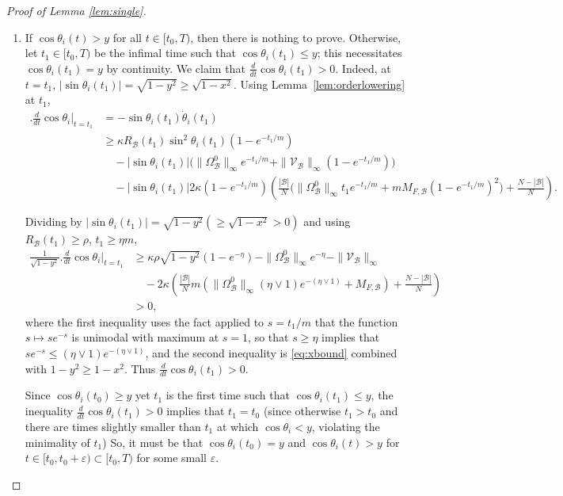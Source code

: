 \documentclass[10pt,a4paper]{amsart}
\begin{document}
\begin{proof}[Proof of Lemma \ref{lem:single}]
	\,
\begin{enumerate}
\item 
If $\cos\theta_i(t)>y$ for all $t\in [t_0,T)$, then there is nothing to prove. Otherwise, let $t_1\in[t_0,T)$ be the infimal time  such that
$\cos\theta_i(t_1)\le y$; this necessitates $\cos\theta_i(t_1)=y$ by continuity. We claim that $\frac{d}{dt}\cos\theta_i(t_1)>0$. Indeed, at $t=t_1$, $|\sin\theta_i(t_1)|=\sqrt{1-y^2}\ge\sqrt{1-x^2}$. Using
Lemma~\ref{lem:orderlowering} at $t_1$,
\begin{align*}
\bigl.\tfrac{d}{dt}\cos\theta_i\bigr|_{t=t_1}
&=-\sin\theta_i(t_1)\dot\theta_i(t_1)\\
&\ge \kappa R_\mathcal{B}(t_1)\sin^2\theta_i(t_1)(1-e^{-t_1/m})\\
&\quad-|\sin\theta_i(t_1)|\bigl(\|\Omega_\mathcal{B}^0\|_\infty e^{-t_1/m}+\|\mathcal V_\mathcal{B}\|_\infty(1-e^{-t_1/m})\bigr)\\
&\quad-|\sin\theta_i(t_1)|2\kappa (1-e^{-t_1/m})\left(\frac{|\mathcal{B}|}{N}\bigl(\|\Omega_\mathcal{B}^0\|_\infty t_1 e^{-t_1/m}+m M_{F,\mathcal{B}}(1-e^{-t_1/m})^2\bigr)+\frac{N-|\mathcal{B}|}{N}\right).
\end{align*}

Dividing by $|\sin\theta_i(t_1)|=\sqrt{1-y^2}(\ge\sqrt{1-x^2}>0)$ and using
$R_\mathcal{B}(t_1)\ge\rho$, $t_1\ge\eta m$,
\begin{align*}
\frac{1}{\sqrt{1-y^2}}\bigl.\tfrac{d}{dt}\cos\theta_i\bigr|_{t=t_1}
&\ge \kappa\rho\sqrt{1-y^2}(1-e^{-\eta})-\|\Omega_\mathcal{B}^0\|_\infty e^{-\eta}-\|\mathcal V_\mathcal{B}\|_\infty\\
&\quad-2\kappa\left(\frac{|\mathcal{B}|}{N}m\left(\|\Omega_\mathcal{B}^0\|_\infty(\eta\vee 1)e^{-(\eta\vee 1)}+ M_{F,\mathcal{B}}\right)+\frac{N-|\mathcal{B}|}{N}\right)\\
&>0,
\end{align*}
where the first inequality uses the fact applied to $s=t_1/m$ that the function $s\mapsto se^{-s}$ is unimodal with maximum at $s=1$, so that $s\ge \eta$ implies that $se^{-s}\le (\eta\vee 1)e^{-(\eta\vee 1)}$, and
the second inequality is \eqref{eq:xbound} combined with $1-y^2\ge 1-x^2$. Thus
$\frac{d}{dt}\cos\theta_i(t_1)>0$.

Since $\cos\theta_i(t_0)\ge y$ yet $t_1$ is the first time such that $\cos\theta_i(t_1)\le y$, the inequality $\frac{d}{dt}\cos\theta_i(t_1)>0$ implies that $t_1=t_0$ (since otherwise $t_1>t_0$ and there are times slightly smaller than $t_1$ at which $\cos \theta_i<y$, violating the minimality of $t_1$) So, it must be that $\cos\theta_i(t_0)=y$ and $\cos\theta_i(t)>y$ for $t\in [t_0,t_0+\varepsilon)\subset [t_0,T)$ for some small $\varepsilon$.


\end{enumerate}
\end{proof}
\end{document}
